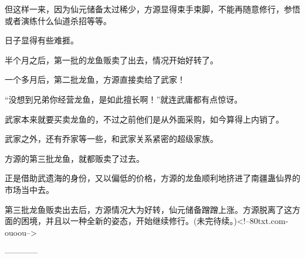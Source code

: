 \begin{this_body}
但这样一来，因为仙元储备太过稀少，方源显得束手束脚，不能再随意修行，参悟或者演练什么仙道杀招等等。

日子显得有些难捱。

半个月之后，第一批的龙鱼贩卖了出去，情况开始好转了。

一个多月后，第二批龙鱼，方源直接卖给了武家！

“没想到兄弟你经营龙鱼，是如此擅长啊！”就连武庸都有点惊讶。

武家本来就要买卖龙鱼的，不过之前他们是从外面采购，如今算得上内销了。

武家之外，还有乔家等一些，和武家关系紧密的超级家族。

方源的第三批龙鱼，就都贩卖了过去。

正是借助武遗海的身份，又以偏低的价格，方源的龙鱼顺利地挤进了南疆蛊仙界的市场当中去。

第三批龙鱼贩卖出去后，方源情况大为好转，仙元储备蹭蹭上涨。方源脱离了这方面的困境，并且以一种全新的姿态，开始继续修行。(未完待续。)<!--80txt.com-ouoou-->

------------

\end{this_body}

